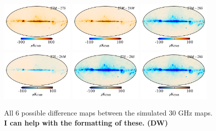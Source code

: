 \documentclass{aa}
\begin{document}
\begin{figure}
\includegraphics[width=0.31\textwidth]{figs/sim_27M_minus_27S.pdf} 
\includegraphics[width=0.31\textwidth]{figs/sim_27M_minus_28M.pdf} 
\includegraphics[width=0.31\textwidth]{figs/sim_27M_minus_28S.pdf}\\
\includegraphics[width=0.31\textwidth]{figs/sim_27S_minus_28M.pdf} 
\includegraphics[width=0.31\textwidth]{figs/sim_27S_minus_28S.pdf}
\includegraphics[width=0.31\textwidth]{figs/sim_28M_minus_28S.pdf}
\caption{All 6 possible difference maps between the simulated 30 GHz maps. 
	{\bf I can help with the formatting of these. (DW)}
	} \label{fig:sim_bp_diffs}
\end{figure}
\end{document}
